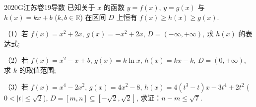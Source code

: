 
\begin{problem}{2020}{G}{江苏卷}{19}{导数}
已知关于 $x$ 的函数 $y=f(x)$, $y=g(x)$ 与 $h(x)=kx+b$ ($k,b\in\mathbb{R}$) 在区间 $D$ 上恒有 $f(x)\geq h(x)\geq g(x)$.

（1）若 $f(x)=x^2+2x$, $g(x)=-x^2+2x$, $D=(-\infty,+\infty)$, 求 $h(x)$ 的表达式;

（2）若 $f(x)=x^2-x+b$, $g(x)=k\ln x$, $h(x)=kx-k$, $D=(0,+\infty)$, 求 $k$ 的取值范围;

（3）若 $f(x)=x^4-2x^2$, $g(x)=4x^2-8$, $h(x)=4\left(t^3-t\right)x-3t^4+2t^2$ ($0<|t|\leq\sqrt{2}$), $D=\left[m,n\right]\subseteq\left[-\sqrt{2},\sqrt{2}\right]$, 求证：$n-m\leq\sqrt{7}$.
\end{problem}